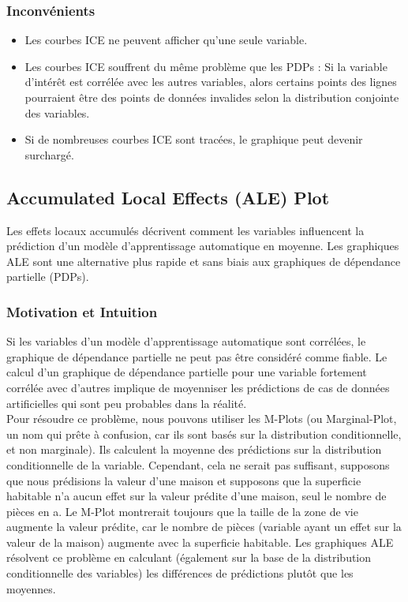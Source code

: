 \subsubsection{Inconvénients}
\begin{itemize}
    \item Les courbes ICE ne peuvent afficher qu'une seule variable.
    \item Les courbes ICE souffrent du même problème que les PDPs : Si la variable d'intérêt est corrélée avec les autres variables, alors certains points des lignes pourraient être des points de données invalides selon la distribution conjointe des variables.
    \item Si de nombreuses courbes ICE sont tracées, le graphique peut devenir surchargé.
\end{itemize}


\subsection{Accumulated Local Effects (ALE) Plot}

Les effets locaux accumulés décrivent comment les variables influencent la prédiction d'un modèle d'apprentissage automatique en moyenne. Les graphiques ALE sont une alternative plus rapide et sans biais aux graphiques de dépendance partielle (PDPs).

\subsubsection{Motivation et Intuition}

Si les variables d'un modèle d'apprentissage automatique sont corrélées, le graphique de dépendance partielle ne peut pas être considéré comme fiable. Le calcul d'un graphique de dépendance partielle pour une variable fortement corrélée avec d'autres implique de moyenniser les prédictions de cas de données artificielles qui sont peu probables dans la réalité. 
\\
Pour résoudre ce problème, nous pouvons utiliser les M-Plots (ou Marginal-Plot, un nom qui prête à confusion, car ils sont basés sur la distribution conditionnelle, et non marginale). Ils calculent la moyenne des prédictions sur la distribution conditionnelle de la variable. Cependant, cela ne serait pas suffisant, supposons que nous prédisions la valeur d'une maison et supposons que la superficie habitable n'a aucun effet sur la valeur prédite d'une maison, seul le nombre de pièces en a. Le M-Plot montrerait toujours que la taille de la zone de vie augmente la valeur prédite, car le nombre de pièces (variable ayant un effet sur la valeur de la maison) augmente avec la superficie habitable. Les graphiques ALE résolvent ce problème en calculant (également sur la base de la distribution conditionnelle des variables) les différences de prédictions plutôt que les moyennes.

